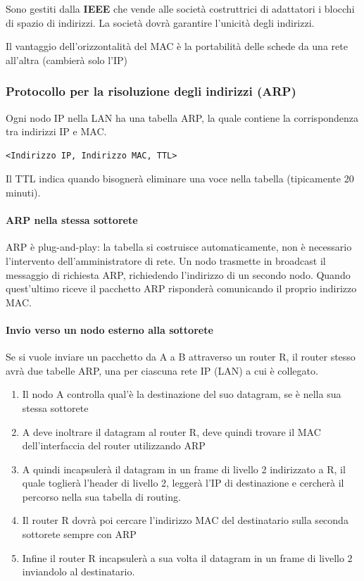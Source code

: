 \documentclass{report}
\begin{document}
Sono gestiti dalla \textbf{IEEE} che vende alle società costruttrici di
adattatori i blocchi di spazio di indirizzi. La società dovrà garantire
l'unicità degli indirizzi.

Il vantaggio dell'orizzontalità del MAC è la portabilità delle schede da
una rete all'altra (cambierà solo l'IP)

\hypertarget{header-n115}{%
\subsubsection{Protocollo per la risoluzione degli indirizzi
(ARP)}\label{header-n115}}

Ogni nodo IP nella LAN ha una tabella ARP, la quale contiene la
corrispondenza tra indirizzi IP e MAC.

\begin{verbatim}
<Indirizzo IP, Indirizzo MAC, TTL>
\end{verbatim}

Il TTL indica quando bisognerà eliminare una voce nella tabella
(tipicamente 20 minuti).

\hypertarget{header-n119}{%
\paragraph{ARP nella stessa sottorete}\label{header-n119}}

ARP è plug-and-play: la tabella si costruisce automaticamente, non è
necessario l'intervento dell'amministratore di rete. Un nodo trasmette
in broadcast il messaggio di richiesta ARP, richiedendo l'indirizzo di
un secondo nodo. Quando quest'ultimo riceve il pacchetto ARP risponderà
comunicando il proprio indirizzo MAC.

\hypertarget{header-n121}{%
\paragraph{Invio verso un nodo esterno alla
sottorete}\label{header-n121}}

Se si vuole inviare un pacchetto da A a B attraverso un router R, il
router stesso avrà due tabelle ARP, una per ciascuna rete IP (LAN) a cui
è collegato.

\begin{enumerate}
\def\labelenumi{\arabic{enumi}.}
\item
  Il nodo A controlla qual'è la destinazione del suo datagram, se è
  nella sua stessa sottorete
\item
  A deve inoltrare il datagram al router R, deve quindi trovare il MAC
  dell'interfaccia del router utilizzando ARP
\item
  A quindi incapsulerà il datagram in un frame di livello 2 indirizzato
  a R, il quale toglierà l'header di livello 2, leggerà l'IP di
  destinazione e cercherà il percorso nella sua tabella di routing.
\item
  Il router R dovrà poi cercare l'indirizzo MAC del destinatario sulla
  seconda sottorete sempre con ARP
\item
  Infine il router R incapsulerà a sua volta il datagram in un frame di
  livello 2 inviandolo al destinatario.
\end{enumerate}
\end{document}
